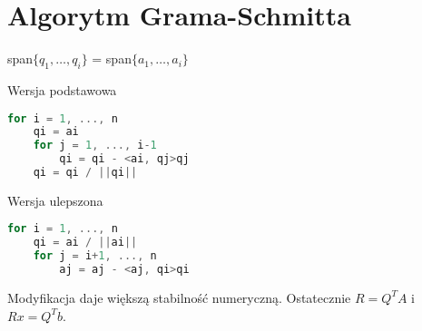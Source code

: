 \section{Algorytm Grama-Schmitta}
span\( \{q_1, \dots, q_i\} \) = span\( \{a_1, \dots, a_i\} \)
\begin{multicols}{2}
	\noindent
	Wersja podstawowa
	\begin{lstlisting}[language=Cpp]
for i = 1, ..., n
    qi = ai
    for j = 1, ..., i-1
        qi = qi - <ai, qj>qj
    qi = qi / ||qi||
\end{lstlisting}
	\columnbreak
	Wersja ulepszona
	\begin{lstlisting}[language=Cpp]
for i = 1, ..., n
    qi = ai / ||ai||
    for j = i+1, ..., n
        aj = aj - <aj, qi>qi
\end{lstlisting}
\end{multicols}
\noindent
Modyfikacja daje większą stabilność numeryczną. Ostatecznie \( R = Q^TA \) i \( Rx = Q^Tb \).
